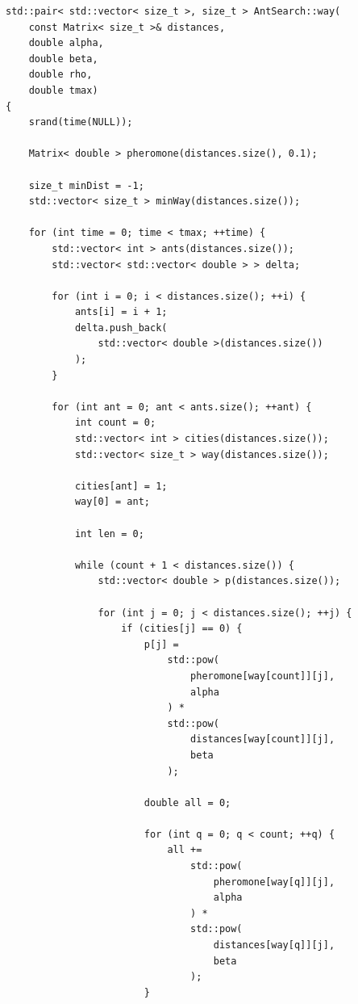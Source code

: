 \documentclass[a4paper,12pt]{article}
\begin{document}
\begin{lstlisting}[caption=Муравьиный алгоритм,label=lst:ant]
std::pair< std::vector< size_t >, size_t > AntSearch::way(
    const Matrix< size_t >& distances,
    double alpha,
    double beta,
    double rho,
    double tmax)
{
    srand(time(NULL));

    Matrix< double > pheromone(distances.size(), 0.1);

    size_t minDist = -1;
    std::vector< size_t > minWay(distances.size());

    for (int time = 0; time < tmax; ++time) {
        std::vector< int > ants(distances.size());
        std::vector< std::vector< double > > delta;

        for (int i = 0; i < distances.size(); ++i) {
            ants[i] = i + 1;
            delta.push_back(
                std::vector< double >(distances.size())
            );
        }

        for (int ant = 0; ant < ants.size(); ++ant) {
            int count = 0;
            std::vector< int > cities(distances.size());
            std::vector< size_t > way(distances.size());

            cities[ant] = 1;
            way[0] = ant;

            int len = 0;

            while (count + 1 < distances.size()) {
                std::vector< double > p(distances.size());

                for (int j = 0; j < distances.size(); ++j) {
                    if (cities[j] == 0) {
                        p[j] =
                            std::pow(
                                pheromone[way[count]][j],
                                alpha
                            ) *
                            std::pow(
                                distances[way[count]][j],
                                beta
                            );

                        double all = 0;

                        for (int q = 0; q < count; ++q) {
                            all +=
                                std::pow(
                                    pheromone[way[q]][j],
                                    alpha
                                ) *
                                std::pow(
                                    distances[way[q]][j],
                                    beta
                                );
                        }


\end{lstlisting}
\end{document}
